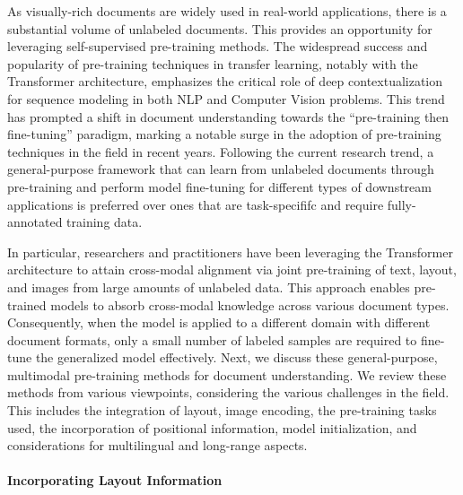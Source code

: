 As visually-rich documents are widely used in real-world applications, there is a substantial volume of unlabeled documents. This provides an opportunity for leveraging self-supervised pre-training methods. The widespread success and popularity of pre-training techniques in transfer learning, notably with the Transformer architecture, emphasizes the critical role of deep contextualization for sequence modeling in both \ac{NLP} and Computer Vision problems. This trend has prompted a shift in document understanding towards the “pre-training then fine-tuning” paradigm, marking a notable surge in the adoption of pre-training techniques in the field in recent years. Following the current research trend, a general-purpose framework that can learn from unlabeled documents through pre-training and perform model fine-tuning for different types of downstream applications is preferred over ones that are task-specififc and require fully-annotated training data.

In particular, researchers and practitioners have been leveraging the Transformer architecture to attain cross-modal alignment via joint pre-training of text, layout, and images from large amounts of unlabeled data. This approach enables pre-trained models to absorb cross-modal knowledge across various document types. Consequently, when the model is applied to a different domain with different document formats, only a small number of labeled samples are required to fine-tune the generalized model effectively. Next, we discuss these general-purpose, multimodal pre-training methods for document understanding. We review these methods from various viewpoints, considering the various challenges in the field. This includes the integration of layout, image encoding, the pre-training tasks used, the incorporation of positional information, model initialization, and considerations for multilingual and long-range aspects.



\paragraph{Incorporating Layout Information} 

